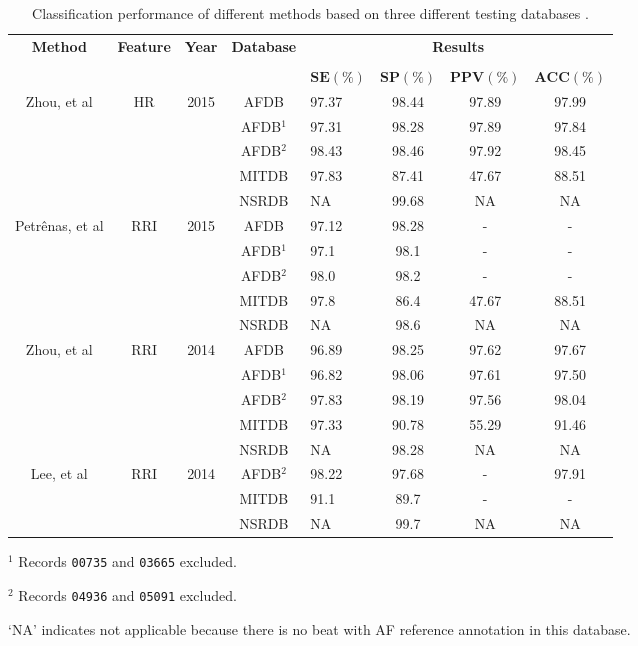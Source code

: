 \begin{table}[h]
\begin{threeparttable}
\caption[Performance comparison of some state of the art methods.]{Classification performance of different methods based on three different testing databases \cite[p. 8]{zhou2015}.}
\label{table:zhou_hr_rri}
\scriptsize
  \begin{tabularx}{\linewidth}{c c c c X c c c}
  \toprule
  \textbf{Method} & \textbf{Feature} & \textbf{Year} & \textbf{Database} & \multicolumn{4}{c}{\textbf{Results}} \\
  \cline{5-8}
  \\
  & & & & $\mathbf{SE(\%)}$ & $\mathbf{SP(\%)}$ & $\mathbf{PPV(\%)}$ & $\mathbf{ACC(\%)}$\\
  \midrule  
  Zhou, et al\cite{zhou2015} & HR & 2015 & AFDB & 97.37 & 98.44 & 97.89 & 97.99\\
  & & & AFDB$^1$ & 97.31 & 98.28 & 97.89 & 97.84 \\
  & & & AFDB$^2$ & 98.43 & 98.46 & 97.92 & 98.45 \\
  & & & MITDB & 97.83 & 87.41 & 47.67 & 88.51 \\
  & & & NSRDB & NA & 99.68 & NA & NA \\
  \hline
  Petrênas, et al\cite{petrenas2015} & RRI & 2015 & AFDB & 97.12 & 98.28 & - & -\\
  & & & AFDB$^1$ & 97.1 & 98.1 & - & - \\
  & & & AFDB$^2$ & 98.0 & 98.2 & - & - \\
  & & & MITDB & 97.8 & 86.4 & 47.67 & 88.51 \\
  & & & NSRDB & NA & 98.6 & NA & NA \\
  \hline
  Zhou, et al\cite{zhou2014} & RRI & 2014 & AFDB & 96.89 & 98.25 & 97.62 & 97.67\\
  & & & AFDB$^1$ & 96.82 & 98.06 & 97.61 & 97.50 \\
  & & & AFDB$^2$ & 97.83 & 98.19 & 97.56 & 98.04 \\
  & & & MITDB & 97.33 & 90.78 & 55.29 & 91.46 \\
  & & & NSRDB & NA & 98.28 & NA & NA \\
  \hline
  Lee, et al\cite{lee2013} & RRI & 2014 & AFDB$^2$ & 98.22 & 97.68 & - & 97.91\\
  & & & MITDB & 91.1 & 89.7 & - & - \\
  & & & NSRDB & NA & 99.7 & NA & NA \\
  \bottomrule
\end{tabularx}
\begin{tablenotes}
 	\item $^1$ Records \verb|00735| and \verb|03665| excluded.
	\item $^2$ Records \verb|04936| and \verb|05091| excluded.
	\item ‘NA’ indicates not applicable because there is no beat with AF reference annotation in this database.
    \end{tablenotes}
\end{threeparttable}
\end{table}

